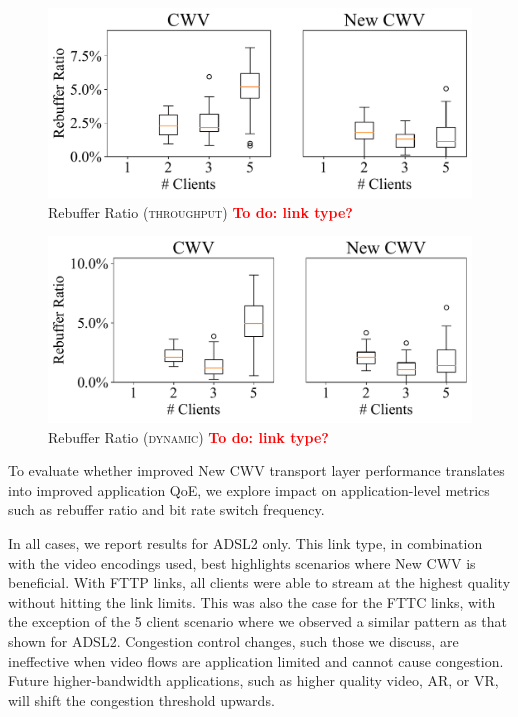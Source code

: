 \documentclass[10pt,sigconf]{acmart}
\newcommand{\todo}[1]{\textbf{\textcolor{red}{To do: #1}}}
\begin{document}
\begin{figure}
    \includegraphics[width=.45\textwidth, keepaspectratio]{figures/Rebuffer_Ratio.pdf}
    \caption{Rebuffer Ratio (\textsc{throughput}) \todo{link type?}}
    \label{fig:rebuffer-ratio}
\end{figure}

\begin{figure}
    \includegraphics[width=.45\textwidth, keepaspectratio]{figures/Rebuffer_Ratio_dynamic.pdf}
    \caption{Rebuffer Ratio (\textsc{dynamic}) \todo{link type?}}
    \label{fig:rebuffer-ratio-dynamic}
\end{figure}

To evaluate whether improved New CWV transport layer performance translates into improved application QoE, we explore impact on application-level metrics such as rebuffer ratio and bit rate switch frequency. 

In all cases, we report results for ADSL2 only. This link type, in combination with the video encodings used, best highlights scenarios where New CWV is beneficial. With FTTP links, all clients were able to stream at the highest quality without hitting the link limits. This was also the case for the FTTC links, with the exception of the 5 client scenario where we observed a similar pattern as that shown for ADSL2. Congestion control changes, such those we discuss, are ineffective when video flows are application limited and cannot cause congestion. Future higher-bandwidth applications, such as higher quality video, AR, or VR, will shift the congestion threshold upwards.
\end{document}
